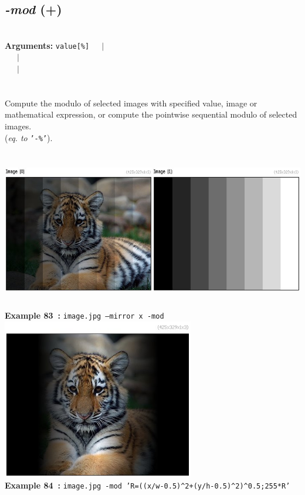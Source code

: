 \documentclass[a4paper,11pt,twoside]{book}
\begin{document}
\subsection{\emph{-mod} (+)}\vspace*{-0.5em}
~\\\textbf{Arguments: } 
{\small \texttt{value[\%]}}~~~$|$\\
\hspace*{2.2cm}{\small \texttt{[image]}}~~~$|$\\
~~~$|$\\
\\~\\
Compute the modulo of selected images with specified value, image or mathematical
expression, or compute the pointwise sequential modulo of selected images.
~\\(\emph{eq. to} {\small \texttt{'-\%'}}).
\begin{center}\includegraphics[keepaspectratio=true,height=7cm,width=\textwidth]{img/gmic_def83.jpg}\\
{\footnotesize \textbf{Example 83~:} \texttt{image.jpg --mirror x -mod}}
\\\includegraphics[keepaspectratio=true,height=7cm,width=\textwidth]{img/gmic_def84.jpg}\\
{\footnotesize \textbf{Example 84~:} \texttt{image.jpg -mod 'R=((x/w-0.5)\textasciicircum 2+(y/h-0.5)\textasciicircum 2)\textasciicircum 0.5;255*R'}}
\end{center}
\end{document}
